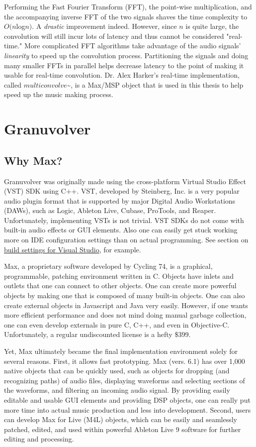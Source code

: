 \documentclass{article}
\begin{document}
			Performing the Fast Fourier Transform (FFT), the point-wise multiplication, and the accompanying inverse FFT of the two signals shaves the time complexity to $O(n$log$n)$. A \emph{drastic} improvement indeed.  However, since $n$ is quite large, the convolution will still incur lots of latency and thus cannot be considered "real-time."  More complicated FFT algorithms take advantage of the audio signals' \emph{linearity} to speed up the convolution process. Partitioning the signals and doing many smaller FFTs in parallel helps decrease latency to the point of making it usable for real-time convolution.\cite{Batten_conv} Dr. Alex Harker's real-time implementation, called $multiconvolve$\~{}, is a Max/MSP object that is used in this thesis to help speed up the music making process.\cite{pa}


	\section{Granuvolver}
		\subsection{Why Max?}
		Granuvolver was originally made using the cross-platform Virtual Studio Effect (VST) SDK using C++. VST, developed by Steinberg, Inc. is a very popular audio plugin format that is supported by major Digital Audio Workstations (DAWs), such as Logic, Ableton Live, Cubase, ProTools, and Reaper.  Unfortunately, implementing VSTs is not trivial. VST SDKs do not come with built-in audio effects or GUI elements. Also one can easily get stuck working more on IDE configuration settings than on actual programming. See section on  \href{http://teragonaudio.com/article/How-to-make-VST-plugins-in-Visual-Studio.html}{build settings for Visual Studio}, for example.

		Max, a proprietary software developed by Cycling 74, is a graphical, programmable, patching environment written in C.  Objects have inlets and outlets that one can connect to other objects. One can create more powerful objects by making one that is composed of many built-in objects. One can also create external objects in Javascript and Java very easily. However, if one wants more efficient performance and does not mind doing manual garbage collection, one can even develop externals in pure C, C++, and even in Objective-C. Unfortunately, a regular undiscounted license is a hefty \$399.

		Yet, Max ultimately became the final implementation environment solely for several reasons. First, it allows fast prototyping. Max (vers. 6.1) has over 1,000 native objects that can be quickly used, such as objects for dropping (and recognizing paths) of audio files, displaying waveforms and selecting sections of the waveforms, and filtering an incoming audio signal. By providing easily editable and usable GUI elements and providing DSP objects, one can really put more time into actual music production and less into development. Second, users can develop Max for Live (M4L) objects, which can be easily and seamlessly patched, edited, and used within powerful Ableton Live 9 software for further editing and processing.
\end{document}
